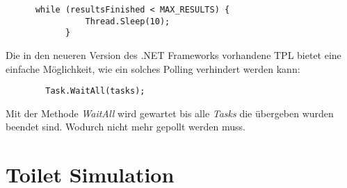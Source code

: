 \documentclass[a4paper,ngerman]{scrartcl}
\begin{document}
\begin{lstlisting}
      while (resultsFinished < MAX_RESULTS) {
                Thread.Sleep(10);
            }
\end{lstlisting} 

Die in den neueren Version des .NET Frameworks vorhandene TPL bietet eine einfache Möglichkeit, wie ein solches Polling
verhindert werden kann:

\begin{lstlisting}
		Task.WaitAll(tasks);
\end{lstlisting}

Mit der Methode \textit{WaitAll} wird gewartet bis alle \textit{Tasks} die übergeben wurden beendet sind. Wodurch nicht
mehr gepollt werden muss.

\section{Toilet Simulation}
\end{document}
